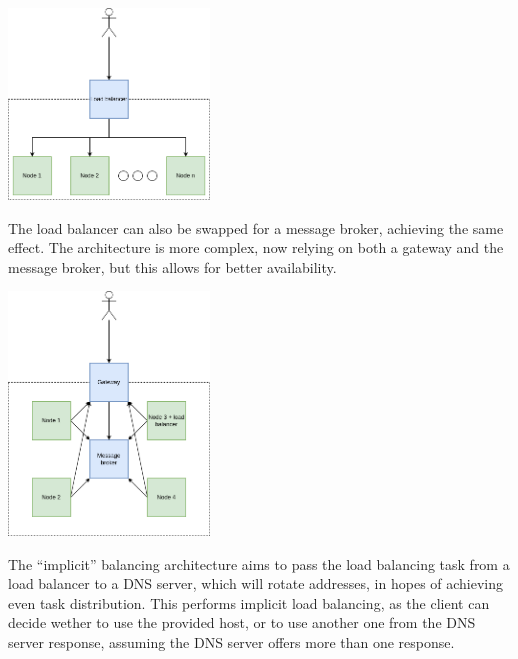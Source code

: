 \documentclass[conference]{IEEEtran}
\begin{document}
    \begin{center}
        \vspace{1em}
        \includegraphics[width=0.4\textwidth]{traditional-load-balancing.png}
         \label{traditional-load-balancing}
        \vspace{1em}
    \end{center}

    The load balancer can also be swapped for a message broker, achieving the same effect. The architecture is more complex,
now relying on both a gateway and the message broker, but this allows for better availability.

    \begin{center}
        \vspace{1em}
        \includegraphics[width=0.4\textwidth]{message-broker-balancing.png}
         \label{message-broker-load-balancing}
        \vspace{1em}
    \end{center}    

    The ``implicit'' balancing architecture aims to pass the load balancing task from a load balancer to a DNS server,
which will rotate addresses, in hopes of achieving even task distribution. This performs implicit load balancing, as the
client can decide wether to use the provided host, or to use another one from the DNS server response, assuming the DNS
server offers more than one response.
\end{document}
